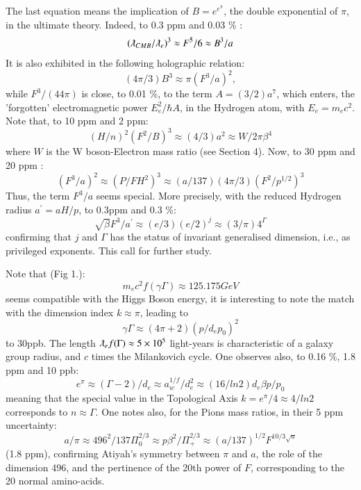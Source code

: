\documentclass[twoside,draft]{article}
\begin{document}
\begin{sloppypar}
The last equation means the implication of $B = e^{e^{\pi}}$, the double exponential of $\pi$, in the ultimate theory. Indeed, to 0.3 ppm and 0.03 \% :
\begin{equation}
(\lambdabar_{CMB}/\lambdabar_e)^3 \approx F^5/6 \approx B^3/a
\end{equation}
It is also exhibited in the following holographic relation:
\begin{equation}
(4\pi/3) B^3 \approx \pi(F^3/a)^2,
\end{equation}
while $F^3/(44\pi)$ is close, to 0.01 \%, to the term $A = (3/2) a^7$, which enters, the 'forgotten' electromagnetic power $E_e^2/\hbar A$, in the Hydrogen atom, with $E_e = m_ec^2$.
Note that, to 10 ppm and 2 ppm:
\begin{equation}
(H/n)^2(F^2/B)^3 \approx (4/3) a^2 \approx W/2\pi \beta^4
\end{equation}
where $W$ is the W boson-Electron mass ratio (see Section 4). Now, to 30 ppm and 20 ppm :  
\begin{equation}
 (F^3/a)^2 \approx (P/FH^2)^3  \approx  (a/137)(4\pi/3)(F^2/p^{1/2})^3 
\end{equation}
Thus, the term $F^3/a$ seems special. More precisely, with the reduced Hydrogen radius $a^{\prime} = aH/p$, to 0.3ppm and 0.3 \%:
\begin{equation}
\sqrt{\beta} F^3/a^{\prime} \approx (e/3)(e/2)^j  \approx (3/\pi) 4^{\Gamma}
\end{equation}
confirming that $j$ and $\Gamma$ has the status of invariant generalised dimension, i.e., as privileged exponents. This call for further study.

Note that (Fig 1.):
\begin{equation}
m_{e} c^{2} f(\gamma\Gamma) \approx 125.175 GeV
\end{equation}
seems compatible with the Higgs Boson energy, it is interesting to note the match with the dimension index $k \approx \pi$, leading to $$\gamma\Gamma \approx (4\pi + 2) (p/d_e p_0)^2 $$ to 30ppb.
The length $\lambdabar_{e} f(\Gamma) \approx 5\times 10^{5}$ light-years is characteristic of a galaxy group radius, and $c$ times the Milankovich cycle. One observes also, to 0.16 \%, 1.8 ppm and 10 ppb:
$$e^\pi \approx (\Gamma - 2)/d_e \approx a_w^{1/f}/d_e^2 \approx (16/ln2)d_e \beta p/p_0$$
meaning that the special value in the Topological Axis $k = e^{\pi} /4 \approx 4/ln2$ corresponds to $n \approx \Gamma$.
One notes also, for the Pions mass ratios, in their 5 ppm uncertainty:
$$a/\pi\approx 496^2/137\Pi_0^{2/3} \approx p\beta^2/\Pi_+^{2/3}\approx (a/137)^{1/2} F^{10/3\sqrt{a}}$$
(1.8 ppm), confirming Atiyah's symmetry between $\pi$ and $a$, the role of the dimension 496, and the pertinence of the 20th power of $F$, corresponding to the 20 normal amino-acids.  


\end{sloppypar}
\end{document}

